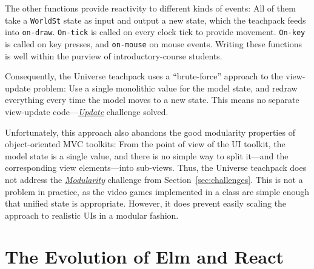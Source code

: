 \documentclass[sigplan,review,screen]{acmart}
\begin{document}
The other functions provide reactivity to different kinds of events:
All of them take a \texttt{WorldSt} state as input and output a new
state, which the teachpack feeds into \texttt{on-draw}.
\texttt{On-tick} is called on every clock tick to provide movement.
\texttt{On-key} is called on
key presses, and \texttt{on-mouse} on mouse events.  Writing these
functions is well within the purview of introductory-course students.

Consequently, the Universe teachpack uses a ``brute-force'' approach
to the view-update problem: Use a single monolithic value for the model
state, and redraw everything every time the model moves to a new
state.  This means no separate view-update code---\hyperlink{challenge:update}{\textit{Update}} challenge
solved.

Unfortunately, this approach also abandons the good modularity
properties of object-oriented MVC toolkits: From the point of view of
the UI toolkit, the model state is a single value, and there is no
simple way to split it---and the corresponding view elements---into
sub-views.  Thus, the Universe
teachpack does not address the \hyperlink{challenge:modularity}{\textit{Modularity}} challenge from
Section~\ref{sec:challenges}.  This is not a
problem in practice, as the video games implemented in
a class are simple enough that unified state is appropriate.  However,
it does prevent easily scaling the approach to realistic UIs in a
modular fashion.

\section{The Evolution of Elm and React}
\label{sec:elm-react}
\end{document}
